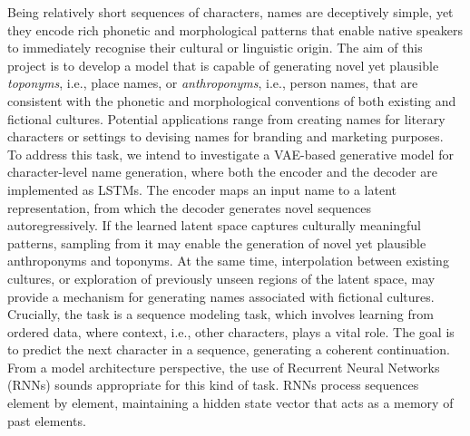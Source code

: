 \documentclass[Main.tex]{subfiles}
\begin{document}
\label{ch:introduction}



Being relatively short sequences of characters, names are deceptively simple, yet they encode rich phonetic and morphological patterns that enable native speakers to immediately recognise their cultural or linguistic origin. The aim of this project is to develop a model that is capable of generating novel yet plausible \textit{toponyms}, i.e., place names, or \textit{anthroponyms}, i.e., person names, that are consistent with the phonetic and morphological conventions of both existing and fictional cultures. Potential applications range from creating names for literary characters or settings to devising names for branding and marketing purposes.\\

To address this task, we intend to investigate a VAE-based generative model for character-level name generation, where both the encoder and the decoder are implemented as LSTMs. The encoder maps an input name to a latent representation, from which the decoder generates novel sequences autoregressively. If the learned latent space captures culturally meaningful patterns, sampling from it may enable the generation of novel yet plausible anthroponyms and toponyms. At the same time, interpolation between existing cultures, or exploration of previously unseen regions of the latent space, may provide a mechanism for generating names associated with fictional cultures. Crucially, the task is a sequence modeling task, which involves learning from ordered data, where context, i.e., other characters, plays a vital role. The goal is to predict the next character in a sequence, generating a coherent continuation. From a model architecture perspective, the use of Recurrent Neural Networks (RNNs) sounds appropriate for this kind of task. RNNs process sequences element by element, maintaining a hidden state vector that acts as a memory of past elements.\\
\end{document}
